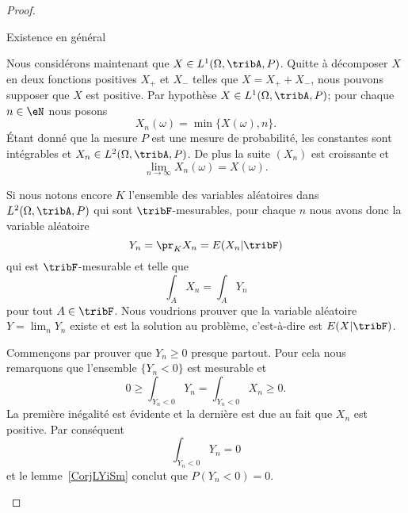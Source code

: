 \begin{proof}
\begin{subproof}
        \item[Existence en général]

            Nous considérons maintenant que \( X\in L^1(\Omega,\tribA,P)\). Quitte à décomposer \( X\) en deux fonctions positives \( X_+\) et \( X_-\) telles que \( X=X_++X_-\), nous pouvons supposer que \( X\) est positive. Par hypothèse \( X\in L^1(\Omega,\tribA,P)\); pour chaque \( n\in\eN\) nous posons
            \begin{equation}
                X_n(\omega)=\min\{ X(\omega),n \}.
            \end{equation}
            Étant donné que la mesure \( P\) est une mesure de probabilité, les constantes sont intégrables et \( X_n\in L^2(\Omega,\tribA,P)\). De plus la suite \( (X_n)\) est croissante et
            \begin{equation}
                \lim_{n\to \infty} X_n(\omega)=X(\omega).
            \end{equation}

            Si nous notons encore \( K\) l'ensemble des variables aléatoires dans \( L^2(\Omega,\tribA,P)\) qui sont \( \tribF\)-mesurables, pour chaque \( n\) nous avons donc la variable aléatoire
            \begin{equation}
                Y_n=\pr_KX_n=E(X_n|\tribF)
            \end{equation}
            qui est \( \tribF\)-mesurable et telle que
            \begin{equation}
                \int_A X_n=\int_AY_n
            \end{equation}
            pour tout \( A\in\tribF\). Nous voudrions prouver que la variable aléatoire \( Y=\lim_nY_n\) existe et est la solution au problème, c'est-à-dire est \( E(X|\tribF)\).

            Commençons par prouver que \( Y_n\geq 0\) presque partout. Pour cela nous remarquons que l'ensemble \( \{ Y_n<0 \}\) est mesurable et
            \begin{equation}
                0\geq\int_{Y_n<0}Y_n=\int_{Y_n<0}X_n\geq 0.
            \end{equation}
            La première inégalité est évidente et la dernière est due au fait que \( X_n\) est positive. Par conséquent
            \begin{equation}
                \int_{Y_n<0}Y_n=0
            \end{equation}
            et le lemme~\ref{CorjLYiSm} conclut que \( P(Y_n<0)=0\).


\end{subproof}
\end{proof}
